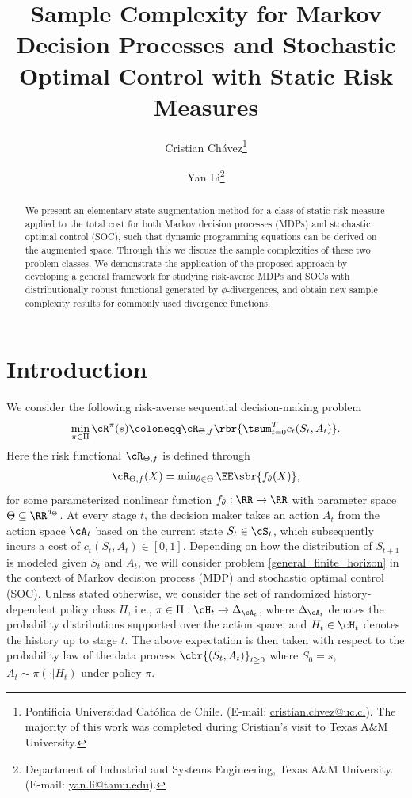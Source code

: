 \documentclass[9pt]{article}
\title{Sample Complexity for Markov Decision Processes and Stochastic Optimal Control with Static Risk Measures}
\author{
Cristian Chávez\thanks{
Pontificia Universidad Católica de Chile. (E-mail: \url{cristian.chvez@uc.cl}).
The majority of this work was completed during Cristian’s visit to Texas A\&M University.
}
\and 
Yan Li\thanks{Department of Industrial and Systems Engineering,
Texas A\&M University. (E-mail: \url{yan.li@tamu.edu}).}
}
\date{\vspace{-0.3in}}
\numberwithin{equation}{section}
\begin{document}
{
\makeatletter
\addtocounter{footnote}{2} %
\renewcommand\thefootnote{\@fnsymbol\c@footnote}%
\makeatother
\maketitle
}


\begin{abstract}
We present an elementary state augmentation method for a class of static risk measure applied to the total cost for both Markov decision processes (MDPs) and stochastic optimal control (SOC), such that dynamic programming equations can be derived on the augmented space. 
Through this we discuss the sample complexities of these two problem classes. 
We demonstrate the application of the proposed approach by developing a general framework for studying risk-averse MDPs and SOCs with distributionally robust functional generated by $\phi$-divergences, and obtain new sample complexity results for commonly used divergence functions.
\end{abstract}



\section{Introduction}

We consider the following risk-averse sequential decision-making problem
\begin{align}\label{general_finite_horizon}
    \min_{\pi \in \Pi} \cR^\pi(s) \coloneqq
    \cR_{\Theta, f} \rbr{ \tsum_{t=0}^T c_t(S_t, A_t)}.
\end{align}
Here the risk functional $ \cR_{\Theta, f} $ is defined through 
\begin{align}\label{eq_risk_functional}
\textstyle
   \cR_{\Theta, f} (X)  = \min_{\theta \in \Theta} \EE \sbr{
   f_\theta(X) 
   },
\end{align}
for some parameterized nonlinear function $f_\theta: \RR \to \RR$ with parameter space $\Theta \subseteq \RR^{d_\Theta}$.
At every stage $t$, the decision maker takes an action $A_t$ from the action space $\cA_t$ based on the current state $S_t \in \cS_t$,
which subsequently incurs a cost of $c_t(S_t, A_t) \in [0,1]$. 
Depending on how the distribution of $S_{t+1}$ is modeled given $S_t$ and $A_t$, 
we will consider problem \eqref{general_finite_horizon} 
in the context of Markov decision process (MDP) and stochastic optimal control (SOC).
Unless stated otherwise, we consider the set of randomized history-dependent policy class $\Pi$, i.e., $\pi \in \Pi: \cH_t \to \Delta_{\cA_t}$, where $\Delta_{\cA_t}$ denotes the probability distributions supported over the action space,
and $H_t \in \cH_t$ denotes the history up to stage $t$.
The above expectation is then taken with respect to the probability law of the data process $\cbr{(S_t, A_t)}_{t \geq 0}$ where $S_0 = s$, $A_t \sim \pi(\cdot|H_t)$ under policy $\pi$.
\end{document}
